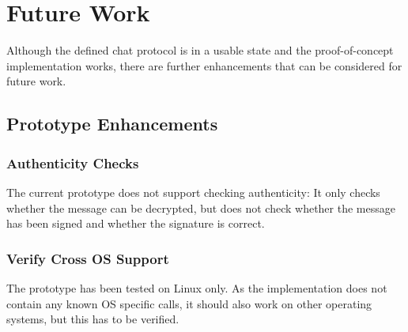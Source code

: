 \section{Future Work}
Although the defined chat protocol is in a usable
state and the proof-of-concept implementation works, there are further
enhancements that can be considered for future work.
\subsection{Prototype Enhancements}
\subsubsection{Authenticity Checks}
The current prototype does not support checking authenticity: It only checks
whether the message can be decrypted, but does not check whether the message
has been signed and whether the signature is correct.
\subsubsection{Verify Cross OS Support}
The prototype has been tested on Linux only. As the implementation does not
contain any known OS specific calls, it should also work on other operating
systems, but this has to be verified.
